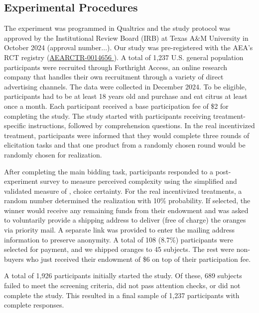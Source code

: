 \documentclass[12pt]{article}
\begin{document}
\subsection{Experimental Procedures}
The experiment was programmed in Qualtrics and the study protocol was approved by the Institutional Review Board (IRB) at Texas A\&M University in October 2024 (approval number...). Our study was pre-registered with the AEA's RCT registry (\href{https://www.socialscienceregistry.org/trials/14656}{AEARCTR-0014656
}). A total of 1,237 U.S. general population participants were recruited through Forthright Access, an online research company that handles their own recruitment through a variety of direct advertising channels. The data were collected in December 2024. To be eligible, participants had to be at least 18 years old and purchase and eat citrus at least once a month. 
Each participant received a base participation fee of \$2 for completing the study. The study started with participants receiving treatment-specific instructions, followed by comprehension questions. In the real incentivized treatment, participants were informed that they would complete three rounds of elicitation tasks and that one product from a randomly chosen round would be randomly chosen for realization. %

After completing the main bidding task, participants responded to a post-experiment survey to measure perceived complexity using the simplified and validated measure of \citet{enke_cognitive_2023},  choice certainty. For the real incentivized treatments, a random number determined the realization with 10\% probability.  If selected, the winner would receive any remaining funds from their endowment and was asked to voluntarily provide a shipping address to deliver (free of charge) the oranges via priority mail. A separate link was provided to enter the mailing address information to preserve anonymity. A total of 108 (8.7\%) participants were selected for payment, and we shipped oranges to 45 subjects. The rest were non-buyers who just received their endowment of \$6 on top of their participation fee. 

A total of 1,926 participants initially started the study. Of these, 689 subjects failed to meet the screening criteria, did not pass attention checks, or did not complete the study. This resulted in a final sample of 1,237 participants with complete responses. 
\end{document}
